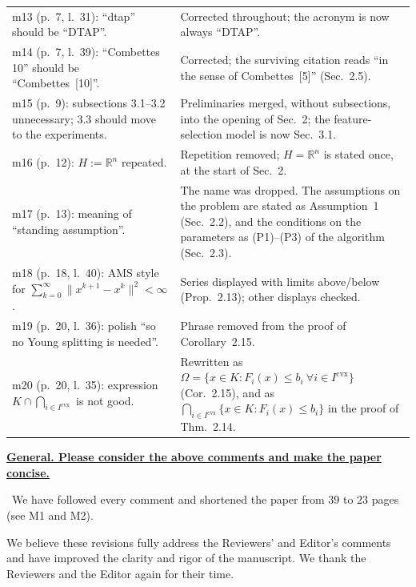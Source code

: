 \documentclass[11pt]{article}
\newcommand{\response}[1]{\smallskip\noindent{\color{blue!60!black}\textbf{Response.}}\ #1\par\medskip}
\newenvironment{point}[1]{\medskip\noindent\textbf{\uline{#1}}\par}{\par}
\begin{document}
{\begin{longtable}{@{}>{\raggedright\arraybackslash}p{}
>{\raggedright\arraybackslash}p{}@{}}
m13 (p.~7, l.~31): ``dtap'' should be ``DTAP''. & Corrected throughout; the acronym is now always ``DTAP''.\\
m14 (p.~7, l.~39): ``Combettes 10'' should be ``Combettes~[10]''. & Corrected; the surviving citation reads ``in the sense of Combettes~[5]'' (Sec.~2.5).\\
m15 (p.~9): subsections 3.1--3.2 unnecessary; 3.3 should move to the experiments. & Preliminaries merged, without subsections, into the opening of Sec.~2; the feature-selection model is now Sec.~3.1.\\
m16 (p.~12): $H:=\mathbb{R}^n$ repeated. & Repetition removed; $H=\mathbb{R}^n$ is stated once, at the start of Sec.~2.\\
m17 (p.~13): meaning of ``standing assumption''. & The name was dropped. The assumptions on the problem are stated as Assumption~1 (Sec.~2.2), and the conditions on the parameters as (P1)--(P3) of the algorithm (Sec.~2.3).\\
m18 (p.~18, l.~40): AMS style for $\sum_{k=0}^{\infty}\lVert x^{k+1}-x^k\rVert^2<\infty$. & Series displayed with limits above/below (Prop.~2.13); other displays checked.\\
m19 (p.~20, l.~36): polish ``so no Young splitting is needed''. & Phrase removed from the proof of Corollary~2.15.\\
m20 (p.~20, l.~35): expression $K\cap\bigcap_{i\in I^{\mathrm{cvx}}}$ is not good. & Rewritten as $\Omega=\{x\in K:F_i(x)\le b_i\ \forall i\in I^{\mathrm{cvx}}\}$ (Cor.~2.15), and as $\bigcap_{i\in I^{\mathrm{cvx}}}\{x\in K:F_i(x)\le b_i\}$ in the proof of Thm.~2.14.\\
\end{longtable}}

\begin{point}{General. Please consider the above comments and make the paper concise.}
\response{We have followed every comment and shortened the paper from $39$ to $23$ pages (see M1 and M2).}
\end{point}

\bigskip
\noindent We believe these revisions fully address the Reviewers' and Editor's comments and have improved the clarity and rigor of the manuscript. We thank the Reviewers and the Editor again for their time.
\end{document}

